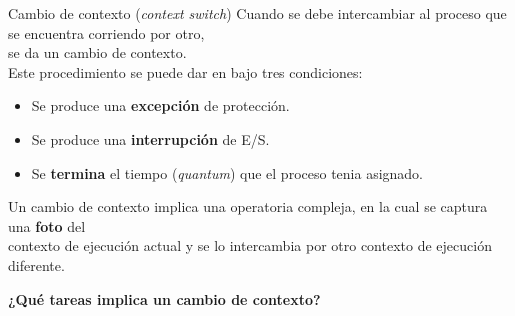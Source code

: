 \documentclass[aspectratio=169]{beamer}
\begin{document}
\begin{frame}[t]{Cambio de contexto (\emph{context switch})}
    Cuando se debe intercambiar al proceso que se encuentra corriendo por otro,\\ se da un cambio de contexto.\\
    \bigskip
    Este procedimiento se puede dar en bajo tres condiciones:
    \begin{itemize}
    \item Se produce una \textbf{excepción} de protección.
    \item Se produce una \textbf{interrupción} de E/S.
    \item Se \textbf{termina} el tiempo (\emph{quantum}) que el proceso tenia asignado.%
    \end{itemize}
    \pause
    \bigskip
    Un cambio de contexto implica una operatoria compleja, en la cual se captura una \textbf{\textcolor{naranjauca}{foto}} del\\
    contexto de ejecución actual y se lo intercambia por otro contexto de ejecución diferente.\\
    \bigskip
    \begin{center}
    \textcolor{naranjauca}{\textbf{¿Qué tareas implica un cambio de contexto?}}
    \end{center}
\end{frame}
\end{document}
